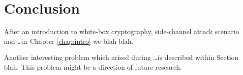 \cleardoublepage{}   %
\chapter*{Conclusion}

After an introduction to white-box cryptography, side-channel attack scenario and \ldots in Chapter \ref{chap:intro} we blah blah.

Another interesting problem which arised during \ldots is described within Section blah. This problem might be a direction of future research.

